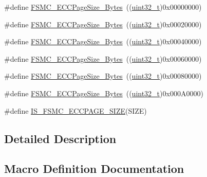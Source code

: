 \begin{DoxyCompactItemize}
\item 
\#define \hyperlink{group___f_s_m_c___e_c_c___page___size_gaaa1661267b44e6728fa64aca79de54b3}{F\+S\+M\+C\+\_\+\+E\+C\+C\+Page\+Size\+\_\+Bytes}~((\hyperlink{_p_e___types_8h_a33594304e786b158f3fb30289278f5af}{uint32\+\_\+t})0x00000000)
\item 
\#define \hyperlink{group___f_s_m_c___e_c_c___page___size_gacb4da17c28dde89e38ff4ed40497f6b5}{F\+S\+M\+C\+\_\+\+E\+C\+C\+Page\+Size\+\_\+Bytes}~((\hyperlink{_p_e___types_8h_a33594304e786b158f3fb30289278f5af}{uint32\+\_\+t})0x00020000)
\item 
\#define \hyperlink{group___f_s_m_c___e_c_c___page___size_ga8137931c96b63ec7e6f80a8c7391433f}{F\+S\+M\+C\+\_\+\+E\+C\+C\+Page\+Size\+\_\+Bytes}~((\hyperlink{_p_e___types_8h_a33594304e786b158f3fb30289278f5af}{uint32\+\_\+t})0x00040000)
\item 
\#define \hyperlink{group___f_s_m_c___e_c_c___page___size_gab8f3ae95becd59e71a976b97ded904b8}{F\+S\+M\+C\+\_\+\+E\+C\+C\+Page\+Size\+\_\+Bytes}~((\hyperlink{_p_e___types_8h_a33594304e786b158f3fb30289278f5af}{uint32\+\_\+t})0x00060000)
\item 
\#define \hyperlink{group___f_s_m_c___e_c_c___page___size_gaec2e9e434685a1756bd171699248f65a}{F\+S\+M\+C\+\_\+\+E\+C\+C\+Page\+Size\+\_\+Bytes}~((\hyperlink{_p_e___types_8h_a33594304e786b158f3fb30289278f5af}{uint32\+\_\+t})0x00080000)
\item 
\#define \hyperlink{group___f_s_m_c___e_c_c___page___size_gab6877a99ddf02e7aa95cf04896ce731d}{F\+S\+M\+C\+\_\+\+E\+C\+C\+Page\+Size\+\_\+Bytes}~((\hyperlink{_p_e___types_8h_a33594304e786b158f3fb30289278f5af}{uint32\+\_\+t})0x000\+A0000)
\item 
\#define \hyperlink{group___f_s_m_c___e_c_c___page___size_ga58fefa0d55875775a88f54ad7498178f}{I\+S\+\_\+\+F\+S\+M\+C\+\_\+\+E\+C\+C\+P\+A\+G\+E\+\_\+\+S\+I\+ZE}(S\+I\+ZE)
\end{DoxyCompactItemize}


\subsection{Detailed Description}


\subsection{Macro Definition Documentation}
